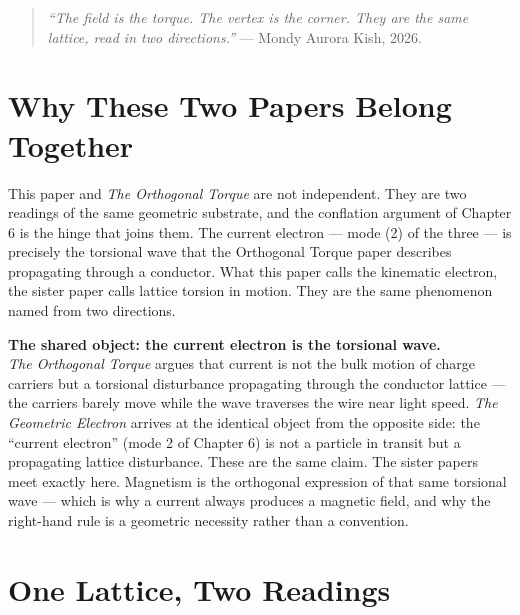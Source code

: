 \documentclass[11pt, letterpaper, openany]{book}
\begin{document}
\begin{quote}
\textit{``The field is the torque. The vertex is the corner. They are
the same lattice, read in two directions.''} --- Mondy Aurora Kish, 2026.
\end{quote}
 
\section{Why These Two Papers Belong Together}
 
This paper and \emph{The Orthogonal Torque} are not independent. They are
two readings of the same geometric substrate, and the conflation argument
of Chapter 6 is the hinge that joins them. The current electron --- mode
(2) of the three --- is precisely the torsional wave that the Orthogonal
Torque paper describes propagating through a conductor. What this paper
calls the kinematic electron, the sister paper calls lattice torsion in
motion. They are the same phenomenon named from two directions.
 
\begin{bridgebox}
\textbf{The shared object: the current electron is the torsional wave.}\\[0.5em]
\emph{The Orthogonal Torque} argues that current is not the bulk motion of
charge carriers but a torsional disturbance propagating through the
conductor lattice --- the carriers barely move while the wave traverses
the wire near light speed. \emph{The Geometric Electron} arrives at the
identical object from the opposite side: the ``current electron'' (mode 2
of Chapter 6) is not a particle in transit but a propagating lattice
disturbance. These are the same claim. The sister papers meet exactly
here. Magnetism is the orthogonal expression of that same torsional wave
--- which is why a current always produces a magnetic field, and why the
right-hand rule is a geometric necessity rather than a convention.
\end{bridgebox}
 
\section{One Lattice, Two Readings}
 
\end{document}
